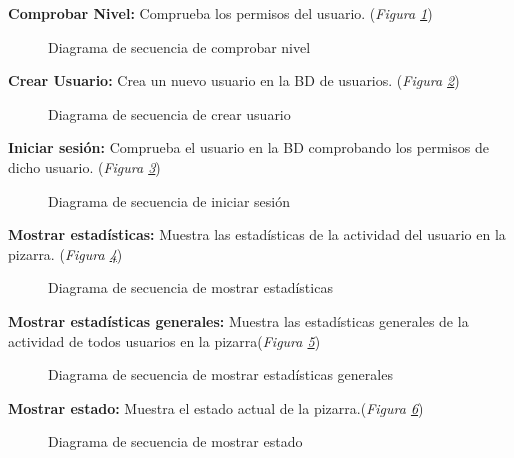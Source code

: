 \textbf{Comprobar Nivel:} Comprueba los permisos del usuario. (\emph{Figura \ref{fig:seqComprobarNivel}}) 

\begin{figure}[H]
\centering
\seqComprobarNivel
\caption{Diagrama de secuencia de comprobar nivel}
\label{fig:seqComprobarNivel}
\end{figure}



\textbf{Crear Usuario:} Crea un nuevo usuario en la BD de usuarios. (\emph{Figura \ref{fig:seqcrearusuario}}) 

\begin{figure}[H]
\centering
\seqCrearUsuario
\caption{Diagrama de secuencia de crear usuario}
\label{fig:seqcrearusuario}
\end{figure}


\textbf{Iniciar sesión:} Comprueba el usuario en la BD comprobando los permisos de dicho usuario. (\emph{Figura \ref{fig:seqIniciarSesion}}) 

\begin{figure}[H]
\centering
\seqIniciarSesion
\caption{Diagrama de secuencia de iniciar sesión}
\label{fig:seqIniciarSesion}
\end{figure}


\textbf{Mostrar estadísticas:} Muestra las estadísticas de la actividad del usuario en la pizarra. (\emph{Figura \ref{fig:seqMostrarEstadisticas}}) 

\begin{figure}[H]
\centering
\seqMostrarEstadisticas
\caption{Diagrama de secuencia de mostrar estadísticas}
\label{fig:seqMostrarEstadisticas}
\end{figure}

\textbf{Mostrar estadísticas generales:} Muestra las estadísticas generales de la actividad de todos usuarios en la pizarra(\emph{Figura \ref{fig:seqMostrarEstadisticasGenerales}}) 

\begin{figure}[H]
\centering
\seqMostrarEstadisticasGenerales
\caption{Diagrama de secuencia de mostrar estadísticas generales}
\label{fig:seqMostrarEstadisticasGenerales}
\end{figure}

\textbf{Mostrar estado:} Muestra el estado actual de la pizarra.(\emph{Figura \ref{fig:seqMostrarEstado}}) 

\begin{figure}[H]
\centering
\seqMostrarEstado
\caption{Diagrama de secuencia de mostrar estado}
\label{fig:seqMostrarEstado}
\end{figure}


